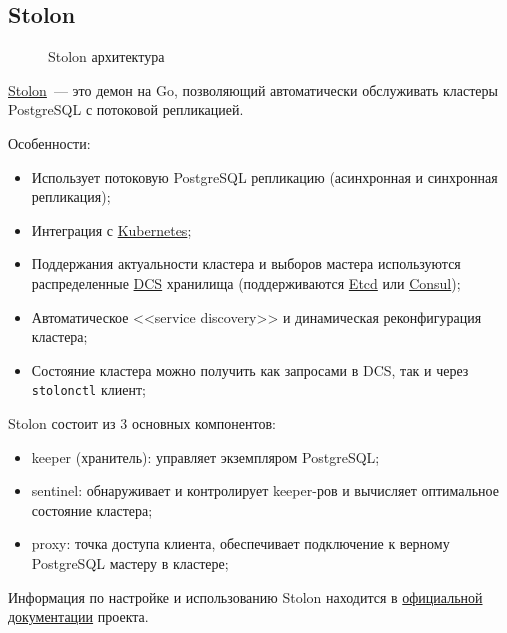 \subsection{Stolon}

\begin{figure}[ht!]
  \caption{Stolon архитектура}
  \label{fig:stolon_arch}
\end{figure}

\href{https://github.com/sorintlab/stolon}{Stolon}~--- это демон на Go, позволяющий автоматически обслуживать кластеры PostgreSQL с потоковой репликацией.

Особенности:

\begin{itemize}
  \item Использует потоковую PostgreSQL репликацию (асинхронная и синхронная репликация);
  \item Интеграция с \href{https://kubernetes.io/}{Kubernetes};
  \item Поддержания актуальности кластера и выборов мастера используются распределенные \href{https://en.wikipedia.org/wiki/Distributed_control_system}{DCS} хранилища (поддерживаются \href{https://coreos.com/etcd}{Etcd} или \href{https://www.consul.io/}{Consul});
  \item Автоматическое <<service discovery>> и динамическая реконфигурация кластера;
  \item Состояние кластера можно получить как запросами в DCS, так и через \lstinline!stolonctl! клиент;
\end{itemize}

Stolon состоит из 3 основных компонентов:

\begin{itemize}
  \item keeper (хранитель): управляет экземпляром PostgreSQL;
  \item sentinel: обнаруживает и контролирует keeper-ров и вычисляет оптимальное состояние кластера;
  \item proxy: точка доступа клиента, обеспечивает подключение к верному PostgreSQL мастеру в кластере;
\end{itemize}

Информация по настройке и использованию Stolon находится в \href{https://github.com/sorintlab/stolon/blob/master/doc/README.md}{официальной документации} проекта.
